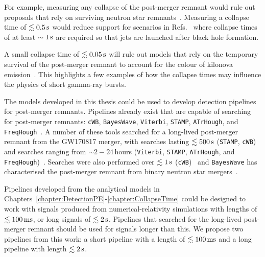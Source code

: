 \documentclass[../Thesis.tex]{subfiles}
\begin{document}
    For example, measuring any collapse of the post-merger remnant would rule out proposals that rely on surviving neutron star remnants~\cite[e.g.,][]{Yu2018}.
    Measuring a collapse time  of $\lesssim 0.5\,\mathrm{s}$ would reduce support for scenarios in Refs.~\cite{Gill2019,Murguia-Berthier2021} where collapse
    times of at least $\sim 1\,\mathrm{s}$ are required so that jets are launched after black hole formation. 

    A small collapse time of $\lesssim 0.05\,\mathrm{s}$ will rule out models that rely on the temporary survival of the post-merger remnant to account for the colour of kilonova emission~\cite{Metzger2018}.
    This highlights a few examples of how the collapse times may influence the physics of short gamma-ray bursts.\par

    The models developed in this thesis could be used to develop detection pipelines for post-merger remnants.
    Pipelines already exist that are capable of searching for post-merger remnants: \texttt{cWB}, \texttt{BayesWave}, \texttt{Viterbi}, \texttt{STAMP}, \texttt{ATrHough}, and  \texttt{FreqHough}~\cite{Thrane2011, Cornish2015,Littenberg2015,Viterbi1967,Klimenko2016, Suvorova2016,GW170817Postmerger1,Chatziioannou2017,Miller2018, Torres-Rivas2019, Oliver2019,GW170817Postmerger2}.
    A number of these tools searched for a long-lived post-merger remnant from the GW170817 merger, with searches lasting $\lesssim 500\,\mathrm{s}$ (\texttt{STAMP}, \texttt{cWB})~\cite{GW170817Postmerger1} and searches ranging from $\sim 2 - 24\,$hours (\texttt{Viterbi}, \texttt{STAMP}, \texttt{ATrHough}, and  \texttt{FreqHough})~\cite{GW170817Postmerger2}.
    Searches were also performed over $\lesssim 1\,\mathrm{s}$ (\texttt{cWB})~\cite{GW170817Postmerger1} and \texttt{BayesWave} has characterised the post-merger remnant from binary neutron star mergers~\cite{Clark2016postmerger,Chatziioannou2017,Torres-Rivas2019,Easter2020}. \par

    Pipelines developed from the analytical models in Chapters~\ref{chapter:DetectionPE}-\ref{chapter:CollapseTime} could be designed to work with signals produced from numerical-relativity simulations with lengths of $\lesssim 100\,\mathrm{ms}$, or long signals of $\lesssim 2\,\mathrm{s}$.
    Pipelines that searched for the long-lived post-merger remnant should be used for signals longer than this.
    We propose two pipelines from this work: a short pipeline with a length of $\lesssim 100\,\mathrm{ms}$ and a long pipeline with length  $\lesssim 2\,\mathrm{s}$. \par
    
\end{document}
